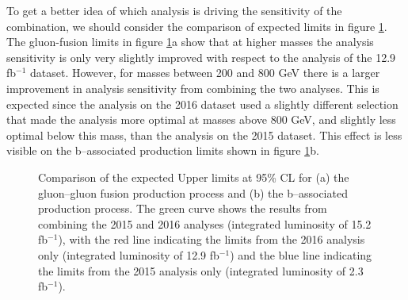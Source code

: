 To get a better idea of which analysis
is driving the sensitivity of the combination, we should consider the comparison
of expected limits in figure \ref{fig:mssm_results_combination_limits_comp}. The
gluon-fusion limits in figure \ref{fig:mssm_results_combination_limits_comp}a show that at
higher masses the analysis sensitivity is only very slightly improved with respect to the 
analysis of the 12.9 fb$^{-1}$ dataset. However, for masses between 200 and 800 GeV
there is a larger improvement in analysis sensitivity from combining the two analyses.
This is expected since the analysis on the 2016 dataset used a slightly different
selection that made the analysis more optimal at masses above 800 GeV,
and slightly less optimal below this mass, than the analysis on the 2015 dataset. This
effect is less visible on the b--associated production limits shown in figure \ref{fig:mssm_results_combination_limits_comp}b.

\begin{figure}[h!]
\begin{center}
\end{center}
\caption{Comparison of the expected Upper limits at 95\% CL for (a) the gluon--gluon fusion production
process and (b) the b--associated production process. The green curve shows the results
from combining the 2015 and 2016 analyses (integrated luminosity of 15.2 fb$^{-1}$),
with the red line indicating the limits from the 2016 analysis only (integrated luminosity of 12.9 fb$^{-1}$)
and the blue line indicating the limits from the 2015 analysis only (integrated luminosity of 2.3 fb$^{-1}$).}
\label{fig:mssm_results_combination_limits_comp}
\end{figure}




